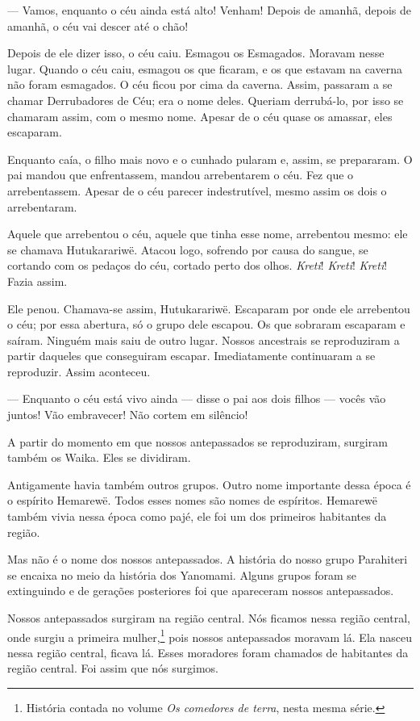 --- Vamos, enquanto o céu ainda está alto! Venham! Depois de amanhã,
depois de amanhã, o céu vai descer até o chão! 

Depois de ele dizer isso, o céu caiu. Esmagou os Esmagados. Moravam
nesse lugar. Quando o céu caiu, esmagou os que ficaram, e os que estavam
na caverna não foram esmagados. O céu ficou por cima da caverna. Assim,
passaram a se chamar Derrubadores de Céu; era o nome deles. Queriam
derrubá-lo, por isso se chamaram assim, com o mesmo nome. Apesar de o
céu quase os amassar, eles escaparam. 

Enquanto caía, o filho mais novo e o cunhado pularam e, assim, se
prepararam. O pai mandou que enfrentassem, mandou arrebentarem o céu. Fez
que o arrebentassem. Apesar de o céu parecer indestrutível, mesmo assim
os dois o arrebentaram. 

Aquele que arrebentou o céu, aquele que tinha esse nome, arrebentou
mesmo: ele se chamava Hutukarariwë. Atacou logo, sofrendo por causa do
sangue, se cortando com os pedaços do céu, cortado perto dos
olhos. \textit{Kreti}! \textit{Kreti}! \textit{Kreti}! Fazia assim. 

Ele penou. Chamava-se assim, Hutukarariwë. Escaparam por onde ele
arrebentou o céu; por essa abertura, só o grupo dele escapou. Os que
sobraram escaparam e saíram. Ninguém mais saiu de outro lugar. Nossos
ancestrais se reproduziram a partir daqueles que conseguiram escapar.
Imediatamente continuaram a se reproduzir. Assim aconteceu. 

--- Enquanto o céu está vivo ainda --- disse o pai aos dois filhos ---
vocês vão juntos! Vão embravecer! Não cortem em silêncio! 

A partir do momento em que nossos antepassados se reproduziram, surgiram
também os Waika. Eles se dividiram.

Antigamente havia também outros grupos. Outro nome importante dessa
época é o espírito Hemarewë. Todos esses nomes são nomes de espíritos.
Hemarewë também vivia nessa época como pajé, ele foi um dos primeiros
habitantes da região.

Mas não é o nome dos nossos antepassados. A história do nosso grupo
Parahiteri se encaixa no meio da história dos Yanomami. Alguns grupos
foram se extinguindo e de gerações posteriores foi que apareceram nossos
antepassados. 

Nossos antepassados surgiram na região central. Nós ficamos nessa
região central, onde surgiu a primeira mulher,\footnote{História contada no volume \textit{Os comedores de terra}, nesta mesma série.} pois nossos antepassados
moravam lá. Ela nasceu nessa região central, ficava lá. Esses moradores
foram chamados de habitantes da região central. Foi assim que nós
surgimos.

